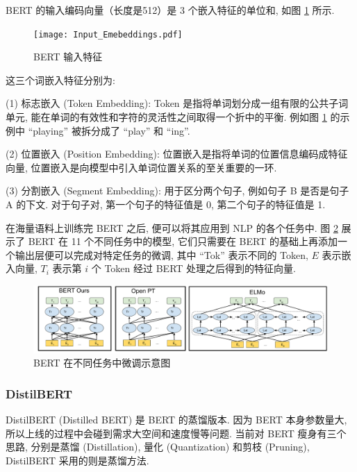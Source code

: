 \documentclass[12pt]{article}
\begin{document}
BERT 的输入编码向量（长度是512）是 3 个嵌入特征的单位和, 如图 \ref{fig:bert_embeddings} 所示.
\begin{figure}[htbp]
  \centering
  \texttt{[image: Input\_Emebeddings.pdf]}
  \caption{BERT 输入特征}
  \label{fig:bert_embeddings}
\end{figure}

这三个词嵌入特征分别为: 

(1) 标志嵌入 (Token Embedding): Token 是指将单词划分成一组有限的公共子词单元, 能在单词的有效性和字符的灵活性之间取得一个折中的平衡. 例如图 \ref{fig:bert_embeddings} 的示例中 ``playing'' 被拆分成了 ``play'' 和 ``ing''.

(2) 位置嵌入 (Position Embedding): 位置嵌入是指将单词的位置信息编码成特征向量, 位置嵌入是向模型中引入单词位置关系的至关重要的一环.

(3) 分割嵌入 (Segment Embedding): 用于区分两个句子, 例如句子 B 是否是句子 A 的下文. 对于句子对, 第一个句子的特征值是 0, 第二个句子的特征值是 1.


在海量语料上训练完 BERT 之后, 便可以将其应用到 NLP 的各个任务中. 图 \ref{fig:BERT_fine_tune} 展示了 BERT 在 11 个不同任务中的模型, 它们只需要在 BERT 的基础上再添加一个输出层便可以完成对特定任务的微调, 其中 ``Tok'' 表示不同的 Token,  $E$ 表示嵌入向量,  $T_i$ 表示第 $i$ 个 Token 经过 BERT 处理之后得到的特征向量.
\begin{figure}[htbp]
  \centering
  \includegraphics[width=16cm]{BERT_fine_tune.pdf}
  \caption{BERT 在不同任务中微调示意图}
  \label{fig:BERT_fine_tune}
\end{figure}


\subsubsection{DistilBERT}



DistilBERT (Distilled BERT) \cite{Sanh2019Distilbert} 是 BERT 的蒸馏版本. 因为 BERT 本身参数量大, 所以上线的过程中会碰到需求大空间和速度慢等问题. 当前对 BERT 瘦身有三个思路, 分别是蒸馏 (Distillation), 量化 (Quantization) 和剪枝 (Pruning), DistilBERT 采用的则是蒸馏方法.
\end{document}
